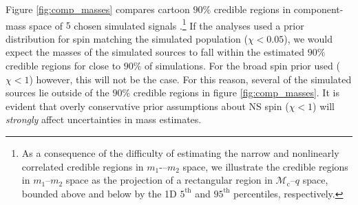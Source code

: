 Figure \ref{fig:comp_masses} compares cartoon $90\%$ credible regions in component-mass space of $5$ chosen simulated signals \citep[cf.][figure 1]{Chatziioannou_2014}.\footnote{As a consequence of the difficulty of estimating the narrow and nonlinearly correlated credible regions in $m_1$-–$m_2$ space, we illustrate the credible regions in $m_1$--$m_2$ space as the projection of a rectangular region in $\mathcal{M}_\mathrm{c}$--$q$ space, bounded above and below by the 1D $5^\mathrm{th}$ and $95^\mathrm{th}$ percentiles, respectively.} If the analyses used a prior distribution for spin matching the simulated population ($\chi < 0.05$), we would expect the masses of the simulated sources to fall within the estimated $90\%$ credible regions for close to $90\%$ of simulations. For the broad spin prior used ($\chi < 1$) however, this will not be the case.  For this reason, several of the simulated sources lie outside of the $90\%$ credible regions in figure \ref{fig:comp_masses}.  It is evident that overly conservative prior assumptions about NS spin ($\chi < 1$) will \emph{strongly} affect uncertainties in mass estimates.
  
  